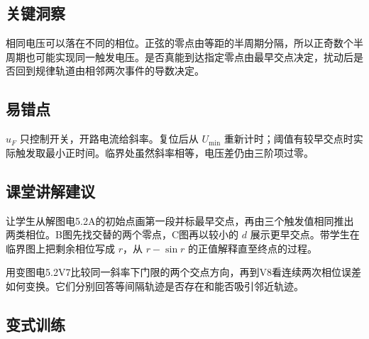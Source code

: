 \documentclass[UTF8,fontset=fandol,a4paper,11pt]{ctexart}
\begin{document}


\subsection*{关键洞察}

相同电压可以落在不同的相位。正弦的零点由等距的半周期分隔，所以正奇数个半周期也可能实现同一触发电压。是否真能到达指定零点由最早交点决定，扰动后是否回到规律轨道由相邻两次事件的导数决定。



\subsection*{易错点}

$u_F$ 只控制开关，开路电流给斜率。复位后从 $U_{\min}$ 重新计时；阈值有较早交点时实际触发取最小正时间。临界处虽然斜率相等，电压差仍由三阶项过零。



\subsection*{课堂讲解建议}

让学生从解图电5.2A的初始点画第一段并标最早交点，再由三个触发值相同推出两类相位。B图先找交替的两个零点，C图再以较小的 $d$ 展示更早交点。带学生在临界图上把剩余相位写成 $r$，从 $r-\sin r$ 的正值解释直至终点的过程。

用变图电5.2V7比较同一斜率下门限的两个交点方向，再到V8看连续两次相位误差如何变换。它们分别回答等间隔轨迹是否存在和能否吸引邻近轨迹。


\subsection*{变式训练}
\end{document}
